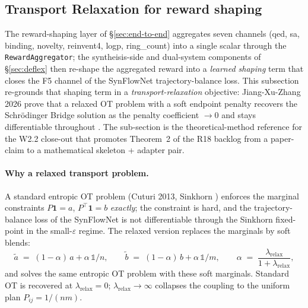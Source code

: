 \subsection{Transport Relaxation for reward shaping}
\label{sec:method:transport-relaxation}

The reward-shaping layer of \S\ref{sec:end-to-end} aggregates seven
channels (qed, sa, binding, novelty, reinvent4, logp, ring\_count)
into a single scalar through the \texttt{RewardAggregator}; the
syntheisis-side and dual-system components of
\S\ref{sec:deflex} then re-shape the aggregated reward into a
\emph{learned shaping} term that closes the F5 channel of the
SynFlowNet trajectory-balance loss.  This subsection re-grounds that
shaping term in a \emph{transport-relaxation} objective:
Jiang-Xu-Zhang 2026 prove that a relaxed OT problem with a soft
endpoint penalty recovers the Schr\"odinger Bridge solution as the
penalty coefficient $\to 0$ and stays differentiable throughout
\cite{jiang2026sb_relax}.  The sub-section is the
theoretical-method reference for the W2.2 close-out that promotes
Theorem~2 of the R18 backlog from a paper-claim to a mathematical
skeleton + adapter pair.

\paragraph{Why a relaxed transport problem.}
A standard entropic OT problem (Cuturi 2013, Sinkhorn
\cite{cuturi2013sinkhorn}) enforces the marginal constraints
$P \mathbf{1} = a$, $P^{\top} \mathbf{1} = b$ \emph{exactly}; the
constraint is hard, and the trajectory-balance loss of the SynFlowNet
is not differentiable through the Sinkhorn fixed-point in the small-$
\varepsilon$ regime.  The relaxed version replaces the marginals by
soft blends:
\begin{equation}
  \label{eq:relaxed-marginals}
  \tilde{a} \;=\; (1 - \alpha)\,a + \alpha\, \mathbb{1}/n, \qquad
  \tilde{b} \;=\; (1 - \alpha)\,b + \alpha\, \mathbb{1}/m, \qquad
  \alpha \;=\; \frac{\lambda_{\mathrm{relax}}}{1 + \lambda_{\mathrm{relax}}},
\end{equation}
and solves the same entropic OT problem with these soft marginals.
Standard OT is recovered at $\lambda_{\mathrm{relax}} = 0$;
$\lambda_{\mathrm{relax}} \to \infty$ collapses the coupling to the
uniform plan $P_{ij} = 1/(nm)$.


